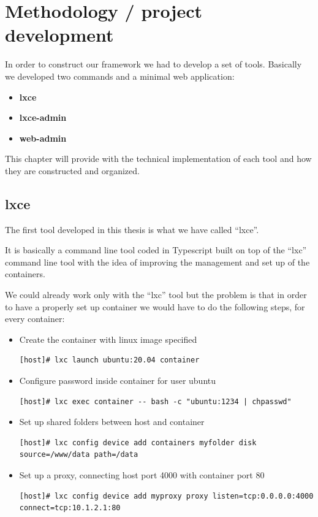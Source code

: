 \clearpage\section{Methodology / project development}

In order to construct our framework we had to develop a set of tools. Basically we developed two commands and a minimal web application:
\begin{itemize}
	\item{\textbf{lxce}}
	\item{\textbf{lxce-admin}}
	\item{\textbf{web-admin}} 
\end{itemize}

This chapter will provide with the technical implementation of each tool and how they are constructed and organized. 

\subsection{lxce}
The first tool developed in this thesis is what we have called ``lxce''.

It is basically a command line tool coded in Typescript built on top of the ``lxc'' command line tool with the idea of improving the management and set up of the containers.

We could already work only with the ``lxc'' tool but the problem is that in order to have a properly set up container we would have to do the following steps, for every container:
\begin{itemize}
	\item{Create the container with linux image specified}
		\begin{verbatim}
[host]# lxc launch ubuntu:20.04 container
		\end{verbatim}
	\item{Configure password inside container for user ubuntu}
		\begin{verbatim}
[host]# lxc exec container -- bash -c "ubuntu:1234 | chpasswd"
		\end{verbatim}
	\item{Set up shared folders between host and container}
		\begin{verbatim}
[host]# lxc config device add containers myfolder disk source=/www/data path=/data
		\end{verbatim}
	\item{Set up a proxy, connecting host port 4000 with container port 80}
		\begin{verbatim}
[host]# lxc config device add myproxy proxy listen=tcp:0.0.0.0:4000 connect=tcp:10.1.2.1:80
		\end{verbatim}
\end{itemize}

